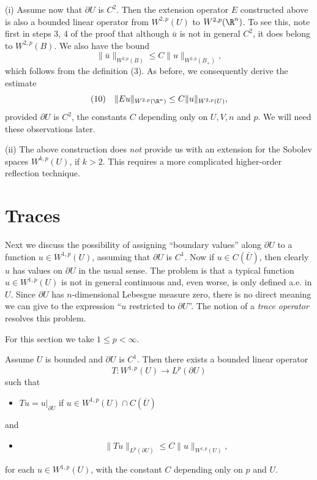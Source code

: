 \begin{remark}
\label{rem:extension-higher-order-remark}
(i) Assume now that $\partial U$ is $C^2$. Then the extension operator $E$ constructed above is also a bounded linear operator from $W^{2,p}(U)$ to $W^{2,p}(\R^n)$. To see this, note first in steps 3, 4 of the proof that although $\bar{u}$ is not in general $C^2$, it does belong to $W^{2,p}(B)$. We also have the bound
$$\|\bar{u}\|_{W^{2,p}(B)} \le C\|u\|_{W^{2,p}(B_+)},$$
which follows from the definition (3). As before, we consequently derive the estimate
$$(10) \quad \|Eu\|_{W^{2,p}(\R^n)} \le C\|u\|_{W^{2,p}(U)},$$
provided $\partial U$ is $C^2$, the constants $C$ depending only on $U, V, n$ and $p$. We will need these observations later.

(ii) The above construction does \textit{not} provide us with an extension for the Sobolev spaces $W^{k,p}(U)$, if $k > 2$. This requires a more complicated higher-order reflection technique.
\end{remark}

\section{Traces}
\label{sec:sobolev-traces}

Next we discuss the possibility of assigning ``boundary values'' along $\partial U$ to a function $u \in W^{1,p}(U)$, assuming that $\partial U$ is $C^1$. Now if $u \in C(\bar{U})$, then clearly $u$ has values on $\partial U$ in the usual sense. The problem is that a typical function $u \in W^{1,p}(U)$ is not in general continuous and, even worse, is only defined a.e. in $U$. Since $\partial U$ has $n$-dimensional Lebesgue measure zero, there is no direct meaning we can give to the expression ``$u$ restricted to $\partial U$''. The notion of a \textit{trace operator} resolves this problem.

For this section we take $1 \le p < \infty$.

\begin{theorem}
\label{thm:trace-theorem}
Assume $U$ is bounded and $\partial U$ is $C^1$. Then there exists a bounded linear operator
$$T : W^{1,p}(U) \to L^p(\partial U)$$
such that
\begin{itemize}
\item[(i)] $Tu = u|_{\partial U}$ if $u \in W^{1,p}(U) \cap C(\overline{U})$
\end{itemize}
and
\begin{itemize}
\item[(ii)] $$\|Tu\|_{L^p(\partial U)} \le C\|u\|_{W^{1,p}(U)},$$
\end{itemize}
for each $u \in W^{1,p}(U)$, with the constant $C$ depending only on $p$ and $U$.
\end{theorem}

